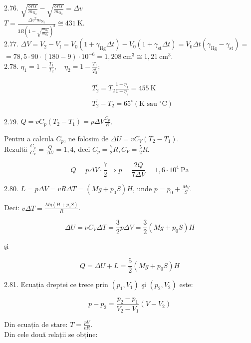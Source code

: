 \documentclass[10pt]{article}
\begin{document}
2.76. $\sqrt{\frac{3 R T}{m_{\mathrm{N}_{2}}}}-\sqrt{\frac{3 R T}{m_{\mathrm{O}_{2}}}}=\Delta v$\\
$T=\frac{\Delta v^{2} m_{\mathrm{N}_{2}}}{3 R\left(1-\sqrt{\frac{m_{\mathrm{N}_{2}}}{m_{\mathrm{O}_{2}}}}\right)^{2}} \cong 431 \mathrm{~K}$.\\
2.77. $\Delta V=V_{2}-V_{\mathrm{I}}=V_{0}\left(1+\gamma_{\mathrm{Hg}} \Delta t\right)-V_{0}\left(1+\gamma_{\mathrm{st}} \Delta t\right)=V_{0} \Delta t\left(\gamma_{\mathrm{Hg}}-\gamma_{\mathrm{st}}\right)=$ $=78,5 \cdot 90 \cdot(180-9) \cdot 10^{-6}=1,208 \mathrm{~cm}^{3} \cong 1,21 \mathrm{~cm}^{3}$.\\
2.78. $\eta_{1}=1-\frac{T_{1}}{T_{2}}, \quad \eta_{2}=1-\frac{T_{1}}{T_{2}^{\prime}}$;

$$
\begin{aligned}
& T_{2}^{\prime}=T_{2} \frac{1-\eta_{1}}{1-\eta_{2}}=455 \mathrm{~K} \\
& T_{2}^{\prime}-T_{2}=65^{\circ}\left(\mathrm{K} \text { sau }{ }^{\circ} \mathrm{C}\right)
\end{aligned}
$$

2.79. $Q=v C_{p}\left(T_{2}-T_{1}\right)=p \Delta V \frac{C_{p}}{R}$.

Pentru a calcula $C_{p}$, ne folosim de $\Delta U=v C_{V}\left(T_{2}-T_{1}\right)$.\\
Rezultă $\frac{C_{p}}{C_{V}}=\frac{Q}{\Delta U}=1,4$, deci $C_{p}=\frac{7}{2} R, C_{V}=\frac{5}{2} R$.

$$
Q=p \Delta V \cdot \frac{7}{2} \Rightarrow p=\frac{2 Q}{7 \Delta V}=1,6 \cdot 10^{4} \mathrm{~Pa}
$$

2.80. $L=p \Delta V=v R \Delta T=\left(M g+p_{0} S\right) H$, unde $p=p_{0}+\frac{M g}{S}$.

Deci: $v \Delta T=\frac{M g\left(H+p_{0} S\right)}{R}$.

$$
\Delta U=\nu C_{V} \Delta T=\frac{3}{2} p \Delta V=\frac{3}{2}\left(M g+p_{0} S\right) H
$$

şi

$$
Q=\Delta U+L=\frac{5}{2}\left(M g+p_{0} S\right) H
$$

2.81. Ecuația dreptei ce trece prin $\left(p_{1}, V_{1}\right)$ şi $\left(p_{2}, V_{2}\right)$ este:

$$
p-p_{2}=\frac{p_{2}-p_{1}}{V_{2}-V_{1}}\left(V-V_{2}\right)
$$

Din ecuația de stare: $T=\frac{p V}{v R}$.\\
Din cele două relații se obține:
\end{document}
